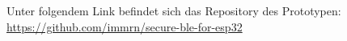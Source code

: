 Unter folgendem Link befindet sich das Repository des Prototypen:\\
\url{https://github.com/immrn/secure-ble-for-esp32}